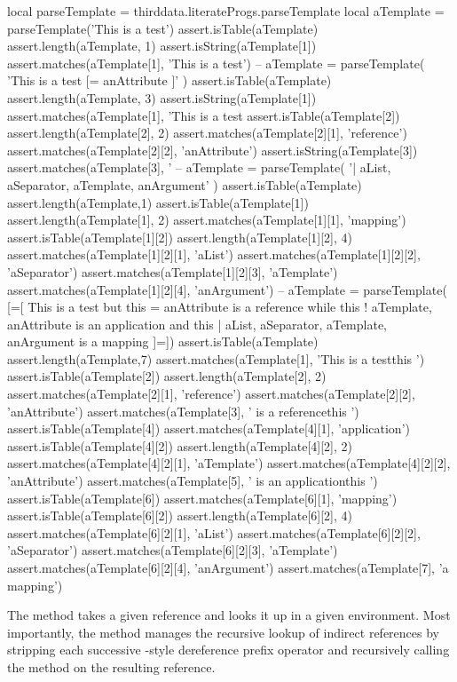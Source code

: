 {{\startLuaTest
local parseTemplate = thirddata.literateProgs.parseTemplate
local aTemplate = parseTemplate('This is a test')
assert.isTable(aTemplate)
assert.length(aTemplate, 1)
assert.isString(aTemplate[1])
assert.matches(aTemplate[1], 'This is a test')
--
aTemplate = parseTemplate(
  'This is a test [{{=  anAttribute  }}]'
)
assert.isTable(aTemplate)
assert.length(aTemplate, 3)
assert.isString(aTemplate[1])
assert.matches(aTemplate[1], 'This is a test %
assert.isTable(aTemplate[2])
assert.length(aTemplate[2], 2)
assert.matches(aTemplate[2][1], 'reference')
assert.matches(aTemplate[2][2], 'anAttribute')
assert.isString(aTemplate[3])
assert.matches(aTemplate[3], '%
--
aTemplate = parseTemplate(
  '{{| aList, aSeparator, aTemplate, anArgument}}'
)
assert.isTable(aTemplate)
assert.length(aTemplate,1)
assert.isTable(aTemplate[1])
assert.length(aTemplate[1], 2)
assert.matches(aTemplate[1][1], 'mapping')
assert.isTable(aTemplate[1][2])
assert.length(aTemplate[1][2], 4)
assert.matches(aTemplate[1][2][1], 'aList')
assert.matches(aTemplate[1][2][2], 'aSeparator')
assert.matches(aTemplate[1][2][3], 'aTemplate')
assert.matches(aTemplate[1][2][4], 'anArgument')
--
aTemplate = parseTemplate(
[=[
This is a test
but this {{= anAttribute }} is a reference
while this {{! aTemplate, anAttribute }} is an application
and this {{| aList, aSeparator, aTemplate, anArgument }}
is a mapping
]=])
assert.isTable(aTemplate)
assert.length(aTemplate,7)
assert.matches(aTemplate[1], 'This is a test\nbut this ')
assert.isTable(aTemplate[2])
assert.length(aTemplate[2], 2)
assert.matches(aTemplate[2][1], 'reference')
assert.matches(aTemplate[2][2], 'anAttribute')
assert.matches(aTemplate[3], ' is a reference\nwhile this ')
assert.isTable(aTemplate[4])
assert.matches(aTemplate[4][1], 'application')
assert.isTable(aTemplate[4][2])
assert.length(aTemplate[4][2], 2)
assert.matches(aTemplate[4][2][1], 'aTemplate')
assert.matches(aTemplate[4][2][2], 'anAttribute')
assert.matches(aTemplate[5], ' is an application\nand this ')
assert.isTable(aTemplate[6])
assert.matches(aTemplate[6][1], 'mapping')
assert.isTable(aTemplate[6][2])
assert.length(aTemplate[6][2], 4)
assert.matches(aTemplate[6][2][1], 'aList')
assert.matches(aTemplate[6][2][2], 'aSeparator')
assert.matches(aTemplate[6][2][3], 'aTemplate')
assert.matches(aTemplate[6][2][4], 'anArgument')
assert.matches(aTemplate[7], '\nis a mapping\n')
\stopLuaTest
\stopTestCase

\stopTestSuite

\startTestSuite[getReference]

The  method takes a given reference and looks it up in 
a given environment. Most importantly, the  method 
manages the recursive lookup of indirect references by stripping each 
successive -style \quote{*} dereference prefix operator and 
recursively calling the  method on the resulting 
reference. 

}}
